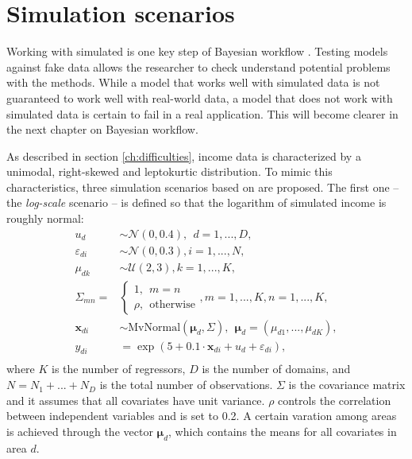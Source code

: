 \section{Simulation scenarios}

Working with simulated is one key step of Bayesian workflow \cite{gelman_bayesian_2020}.
Testing models against fake data allows the researcher to check understand potential problems with the methods.
While a model that works well with simulated data is not guaranteed to work well with real-world data,
a model that does not work with simulated data is certain to fail in a real application.
This will become clearer in the next chapter on Bayesian workflow.

As described in section \ref{ch:difficulties}, income data is characterized by a unimodal, right-skewed and leptokurtic distribution.
To mimic this characteristics, three simulation scenarios based on \cite{rojas_perilla_data_2020} are proposed.
The first one – the \textit{log-scale} scenario – is defined so that the logarithm of simulated income is roughly normal:
\begin{equation}
    \begin{split}
        u_d & \sim \mathcal N(0, 0.4), ~~ d = 1,...,D,\\
        \varepsilon_{di} & \sim \mathcal{N}(0, 0.3), i = 1,...,N,\\
        \mu_{dk} & \sim \mathcal{U}(2, 3), k = 1,...,K,\\
        \Sigma_{mn} = &\begin{cases} 1, ~~ m = n \\ \rho,  ~~ \text{otherwise}  \end{cases},
            m = 1,...,K, n = 1,...,K,\\
        \boldsymbol x_{di}  &\sim \text{MvNormal} (\boldsymbol \mu_{d}, \Sigma) ,
            ~~ \boldsymbol \mu_{d} = (\mu_{d1}, ..., \mu_{dK}),\\
        y_{di} & = \exp(5 + 0.1 \cdot \boldsymbol x_{di}  + u_d + \varepsilon_{di}),\\
    \end{split}
    \label{eq:log_scenario}
\end{equation}
where $K$ is the number of regressors, $D$ is the number of domains, and $N = N_1 + ... + N_D$ is the total number of observations.
$\Sigma$ is the covariance matrix and it assumes that all covariates have unit variance. $\rho$ controls the correlation between independent variables and is set to 0.2.
A certain varation among areas is achieved through the vector $\boldsymbol \mu_d$, which contains the means for all covariates in area $d$.
